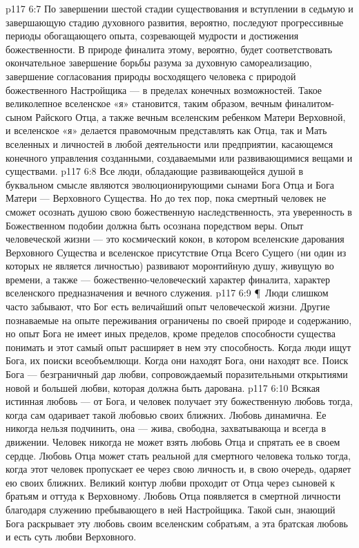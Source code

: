 \vs p117 6:7 По завершении шестой стадии существования и вступлении в седьмую и завершающую стадию духовного развития, вероятно, последуют прогрессивные периоды обогащающего опыта, созревающей мудрости и достижения божественности. В природе финалита этому, вероятно, будет соответствовать окончательное завершение борьбы разума за духовную самореализацию, завершение согласования природы восходящего человека с природой божественного Настройщика --- в пределах конечных возможностей. Такое великолепное вселенское «я» становится, таким образом, вечным финалитом\hyp{}сыном Райского Отца, а также вечным вселенским ребенком Матери Верховной, и вселенское «я» делается правомочным представлять как Отца, так и Мать вселенных и личностей в любой деятельности или предприятии, касающемся конечного управления созданными, создаваемыми или развивающимися вещами и существами.
\vs p117 6:8 Все люди, обладающие развивающейся душой в буквальном смысле являются эволюционирующими сынами Бога Отца и Бога Матери --- Верховного Существа. Но до тех пор, пока смертный человек не сможет осознать душою свою божественную наследственность, эта уверенность в Божественном подобии должна быть осознана поредством веры. Опыт человеческой жизни --- это космический кокон, в котором вселенские дарования Верховного Существа и вселенское присутствие Отца Всего Сущего (ни один из которых не является личностью) развивают моронтийную душу, живущую во времени, а также --- божественно\hyp{}человеческий характер финалита, характер вселенского предназначения и вечного служения.
\vs p117 6:9 \P\ Люди слишком часто забывают, что Бог есть величайший опыт человеческой жизни. Другие познаваемые на опыте переживания ограничены по своей природе и содержанию, но опыт Бога не имеет иных пределов, кроме пределов способности существа понимать и этот самый опыт расширяет в нем эту способность. Когда люди ищут Бога, их поиски всеобъемлющи. Когда они находят Бога, они находят все. Поиск Бога --- безграничный дар любви, сопровождаемый поразительными открытиями новой и большей любви, которая должна быть дарована.
\vs p117 6:10 Всякая истинная любовь --- от Бога, и человек получает эту божественную любовь тогда, когда сам одаривает такой любовью своих ближних. Любовь динамична. Ее никогда нельзя подчинить, она --- жива, свободна, захватывающа и всегда в движении. Человек никогда не может взять любовь Отца и спрятать ее в своем сердце. Любовь Отца может стать реальной для смертного человека только тогда, когда этот человек пропускает ее через свою личность и, в свою очередь, одаряет ею своих ближних. Великий контур любви проходит от Отца через сыновей к братьям и оттуда к Верховному. Любовь Отца появляется в смертной личности благодаря служению пребывающего в ней Настройщика. Такой сын, знающий Бога раскрывает эту любовь своим вселенским собратьям, а эта братская любовь и есть суть любви Верховного.
